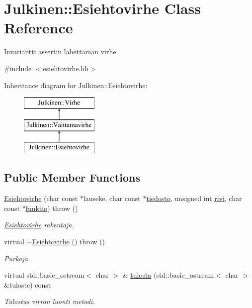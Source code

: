 \hypertarget{class_julkinen_1_1_esiehtovirhe}{}\section{Julkinen\+:\+:Esiehtovirhe Class Reference}
\label{class_julkinen_1_1_esiehtovirhe}


Invariantti assertin lähettämän virhe.  




{\ttfamily \#include $<$esiehtovirhe.\+hh$>$}

Inheritance diagram for Julkinen\+:\+:Esiehtovirhe\+:\begin{figure}[H]
\begin{center}
\leavevmode
\includegraphics[height=3.000000cm]{class_julkinen_1_1_esiehtovirhe}
\end{center}
\end{figure}
\subsection*{Public Member Functions}
\begin{DoxyCompactItemize}
\item 
\hyperlink{class_julkinen_1_1_esiehtovirhe_a9be27b8ea22c7ff666af78925e164e39}{Esiehtovirhe} (char const $\ast$lauseke, char const $\ast$\hyperlink{class_julkinen_1_1_vaittamavirhe_a8624cd880b8466188ef6de480431dffb}{tiedosto}, unsigned int \hyperlink{class_julkinen_1_1_vaittamavirhe_abc571141231b3fa789ae41d2d80642ef}{rivi}, char const $\ast$\hyperlink{class_julkinen_1_1_vaittamavirhe_afd5de6b5639336288d28fd077c84a20c}{funktio})  throw ()
\begin{DoxyCompactList}\small\item\em \hyperlink{class_julkinen_1_1_esiehtovirhe}{Esiehtovirhe} rakentaja. \end{DoxyCompactList}\item 
\hypertarget{class_julkinen_1_1_esiehtovirhe_af5b91194864702d56a2679af08cc7384}{}virtual \hyperlink{class_julkinen_1_1_esiehtovirhe_af5b91194864702d56a2679af08cc7384}{$\sim$\+Esiehtovirhe} ()  throw ()\label{class_julkinen_1_1_esiehtovirhe_af5b91194864702d56a2679af08cc7384}

\begin{DoxyCompactList}\small\item\em Purkaja. \end{DoxyCompactList}\item 
virtual std\+::basic\+\_\+ostream$<$ char $>$ \& \hyperlink{class_julkinen_1_1_esiehtovirhe_a333610e4679e467075bd02c37b9e49bf}{tulosta} (std\+::basic\+\_\+ostream$<$ char $>$ \&tuloste) const 
\begin{DoxyCompactList}\small\item\em Tulostus virran luonti metodi. \end{DoxyCompactList}\end{DoxyCompactItemize}

